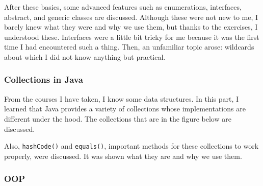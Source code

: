 After these basics, some advanced features such as enumerations, interfaces, abstract, and generic classes are discussed. Although these were not new to me, I barely knew what they were and why we use them, but thanks to the exercises, I understood these. Interfaces were a little bit tricky for me because it was the first time I had encountered such a thing. Then, an unfamiliar topic arose: wildcards about which I did not know anything but practical.

\subsubsection{Collections in Java}

From the courses I have taken, I know some data structures. In this part, I learned that Java provides a variety of collections whose implementations are different under the hood. The collections that are in the figure below are discussed.  

\begin{figure}[h!]
  \centering
\end{figure}

Also, \texttt{hashCode()} and \texttt{equals()}, important methods for these collections to work properly, were discussed. It was shown what they are and why we use them.

\subsubsection{OOP}

